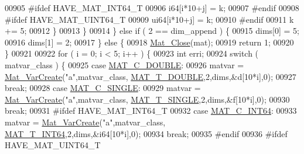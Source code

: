 \begin{DoxyCode}
{{{00905 \textcolor{preprocessor}{#ifdef HAVE\_MAT\_INT64\_T}
00906                     i64[i*10+j] = k;
00907 \textcolor{preprocessor}{#endif}
00908 \textcolor{preprocessor}{#ifdef HAVE\_MAT\_UINT64\_T}
00909                     ui64[i*10+j] = k;
00910 \textcolor{preprocessor}{#endif}
00911                     k += 5;
00912                 \}
00913             \}
00914         \} \textcolor{keywordflow}{else} \textcolor{keywordflow}{if} ( 2 == dim\_append ) \{
00915             dims[0] = 5;
00916             dims[1] = 2;
00917         \} \textcolor{keywordflow}{else} \{
00918             \hyperlink{group___m_a_t_ga101c92ff7bde4a2d4615661beba09262}{Mat\_Close}(mat);
00919             \textcolor{keywordflow}{return} 1;
00920         \}
00921 
00922         \textcolor{keywordflow}{for} ( i = 0; i < 5; i++ ) \{
00923             \textcolor{keywordtype}{int} erri;
00924             \textcolor{keywordflow}{switch} ( matvar\_class ) \{
00925                 \textcolor{keywordflow}{case} \hyperlink{group___m_a_t_ggad4d60ae7b709fc81bfd744fb4c857c40a5d70e0862e5bdb7bd86bf7ba5948f307}{MAT\_C\_DOUBLE}:
00926                     matvar = \hyperlink{group___m_a_t_ga1c54a84bb4d810c6fccdb8869489eac4}{Mat\_VarCreate}(\textcolor{stringliteral}{"a"},matvar\_class,
      \hyperlink{group___m_a_t_ggacf7b3b879282b7ab3a51190e49bf3453a31e721ecf7e188196f83c32838288797}{MAT\_T\_DOUBLE},2,dims,&d[10*i],0);
00927                     \textcolor{keywordflow}{break};
00928                 \textcolor{keywordflow}{case} \hyperlink{group___m_a_t_ggad4d60ae7b709fc81bfd744fb4c857c40a2825631e26a961cbe0f79db50a39cea2}{MAT\_C\_SINGLE}:
00929                     matvar = \hyperlink{group___m_a_t_ga1c54a84bb4d810c6fccdb8869489eac4}{Mat\_VarCreate}(\textcolor{stringliteral}{"a"},matvar\_class,
      \hyperlink{group___m_a_t_ggacf7b3b879282b7ab3a51190e49bf3453a3a3657d40e9212c923d9b9d03531b64c}{MAT\_T\_SINGLE},2,dims,&f[10*i],0);
00930                     \textcolor{keywordflow}{break};
00931 \textcolor{preprocessor}{#ifdef HAVE\_MAT\_INT64\_T}
00932                 \textcolor{keywordflow}{case} \hyperlink{group___m_a_t_ggad4d60ae7b709fc81bfd744fb4c857c40a1ea83bcde49b35477494412973f82409}{MAT\_C\_INT64}:
00933                     matvar = \hyperlink{group___m_a_t_ga1c54a84bb4d810c6fccdb8869489eac4}{Mat\_VarCreate}(\textcolor{stringliteral}{"a"},matvar\_class,
      \hyperlink{group___m_a_t_ggacf7b3b879282b7ab3a51190e49bf3453a9e825b5d18b8f946eaf2b4b57e51c145}{MAT\_T\_INT64},2,dims,&i64[10*i],0);
00934                     \textcolor{keywordflow}{break};
00935 \textcolor{preprocessor}{#endif}
00936 \textcolor{preprocessor}{#ifdef HAVE\_MAT\_UINT64\_T}
}}}
\end{DoxyCode}
